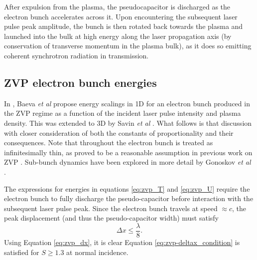 After expulsion from the plasma, the pseudocapacitor is discharged as the electron bunch accelerates across it. Upon encountering the subsequent laser pulse peak amplitude, the bunch is then rotated back towards the plasma and launched into the bulk at high energy along the laser propagation axis (by conservation of transverse momentum in the plasma bulk), as it does so emitting coherent synchrotron radiation in transmission.

\subsection{ZVP electron bunch energies}\label{sec:zvp_energies_derivation}
In \cite{baevaZeroVectorPotential2011}, Baeva \textit{et al} propose energy scalings in \ac{1D} for an electron bunch produced in the \ac{ZVP} regime as a function of the incident laser pulse intensity and plasma density. This was extended to \ac{3D} by Savin \textit{et al} \cite{savinAttosecondscaleAbsorptionExtreme2017}. What follows is that discussion with closer consideration of both the constants of proportionality and their consequences. Note that throughout the electron bunch is treated as infinitesimally thin, as proved to be a reasonable assumption in previous work on ZVP \cite{baevaTheoryHighorderHarmonic2006, savinAttosecondscaleAbsorptionExtreme2017, savinEnergyAbsorptionLaserQED2019}. Sub-bunch dynamics have been explored in more detail by Gonoskov \textit{et al} \cite{gonoskovTheoryRelativisticRadiation2018}.

The expressions for energies in equations \ref{eq:zvp_T} and \ref{eq:zvp_U} require the electron bunch to fully discharge the pseudo-capacitor before interaction with the subsequent laser pulse peak. Since the electron bunch travels at speed $\approx c$, the peak displacement (and thus the pseudo-capacitor width) must satisfy
\begin{equation}\label{eq:zvp-deltax_condition}
	\Delta x \le \frac{\lambda}{8}.
\end{equation}
Using Equation \ref{eq:zvp_dx}, it is clear Equation \ref{eq:zvp-deltax_condition} is satisfied for $ S\ge 1.3$ at normal incidence.

